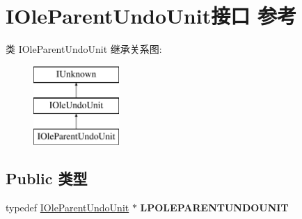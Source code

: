 \hypertarget{interface_i_ole_parent_undo_unit}{}\section{I\+Ole\+Parent\+Undo\+Unit接口 参考}
\label{interface_i_ole_parent_undo_unit}
类 I\+Ole\+Parent\+Undo\+Unit 继承关系图\+:\begin{figure}[H]
\begin{center}
\leavevmode
\includegraphics[height=3.000000cm]{interface_i_ole_parent_undo_unit}
\end{center}
\end{figure}
\subsection*{Public 类型}
\begin{DoxyCompactItemize}
\item 
\mbox{\label{interface_i_ole_parent_undo_unit_adc80e5eb73bbae6c454da1d7df3cb0e6}} 
typedef \hyperlink{interface_i_ole_parent_undo_unit}{I\+Ole\+Parent\+Undo\+Unit} $\ast$ {\bfseries L\+P\+O\+L\+E\+P\+A\+R\+E\+N\+T\+U\+N\+D\+O\+U\+N\+IT}
\end{DoxyCompactItemize}
